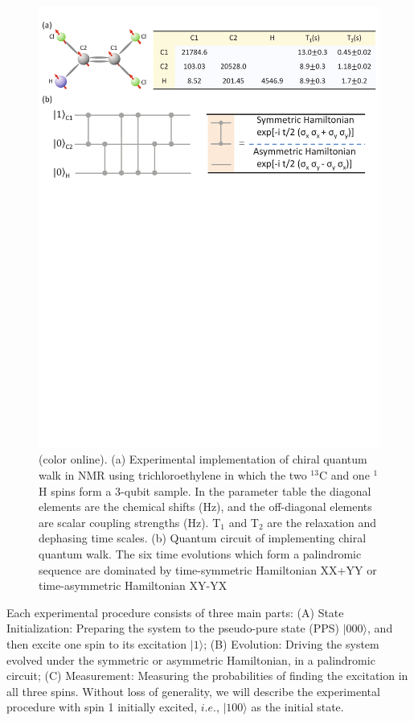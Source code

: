 \documentclass[aps,pra,12pt,nofootinbib,superscriptaddress,longbibliography,showpacs]{revtex4-1}
\theoremstyle{plain}
\theoremstyle{definition}
\newcommand{\ket}[1]{\ensuremath{|#1\rangle}}
\begin{document}
\begin{figure}[h] \centering
\includegraphics[width=0.9\columnwidth]{molecule.pdf}
\caption{(color online). (a) Experimental implementation of chiral quantum walk in NMR using trichloroethylene in which the two $^{13}$C and one $^{1}$H spins form a 3-qubit sample. In the parameter table  the diagonal elements are the chemical shifts (Hz), and the off-diagonal elements are scalar coupling strengths (Hz).  T$_1$ and T$_2$ are the relaxation and dephasing time scales.  (b) Quantum circuit of implementing chiral quantum walk. The six time evolutions which form a palindromic sequence are dominated by time-symmetric Hamiltonian XX+YY or time-asymmetric Hamiltonian XY-YX}\label{molecule}
\end{figure}

Each experimental procedure consists of three main parts: (A) State Initialization: Preparing the system to the pseudo-pure state (PPS) $\ket{000}$, and then excite one spin to its excitation $\ket{1}$; (B) Evolution: Driving the system evolved under the symmetric or asymmetric Hamiltonian, in a palindromic circuit; (C) Measurement: Measuring the probabilities of finding the excitation in all three spins. Without loss of generality, we will describe the experimental procedure with spin 1 initially excited, $i.e.$,  $\ket{100}$ as the initial state.
\end{document}
